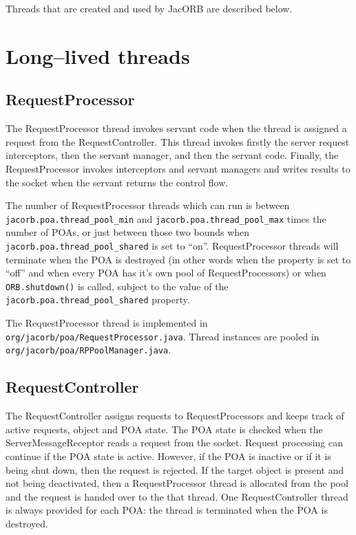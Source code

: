 %
%
Threads that are created and used by JacORB are described below.

\section*{Long--lived threads}

\subsection*{RequestProcessor}
The RequestProcessor thread invokes servant code when the thread is assigned
a request from the RequestController. This thread invokes firstly the server
request interceptors, then the servant manager, and then the servant code.
Finally, the RequestProcessor invokes interceptors and servant managers and
writes results to the socket when the servant returns the control flow.

The number of RequestProcessor threads which can run is between
{\tt jacorb.poa.thread\_pool\_min} and {\tt jacorb.poa.thread\_pool\_max} times
the number of POAs, or just between those two bounds when
{\tt jacorb.poa.thread\_pool\_shared} is set to ``on''. RequestProcessor threads
will terminate when the POA is destroyed (in other words when the property is
set to ``off'' and when every POA has it's own pool of RequestProcessors) or
when {\tt ORB.shutdown()} is called, subject to the value of the
{\tt jacorb.poa.thread\_pool\_shared} property.

The RequestProcessor thread is implemented in
{\tt org/jacorb/poa/RequestProcessor.java}. Thread instances are pooled
in {\tt org/jacorb/poa/RPPoolManager.java}.

\subsection*{RequestController}
The RequestController assigns requests to RequestProcessors and keeps track of
active requests, object and POA state. The POA state is checked when the
ServerMessageReceptor reads a request from the socket. Request
processing can continue if the POA state is active. However, if the POA is
inactive or if it is being shut down, then the request is rejected.
If the target object is present and not being deactivated, then a
RequestProcessor thread is allocated from the pool and the request is handed over to
the that thread. One RequestController thread is always provided for
each POA: the thread is terminated when the POA is destroyed.

